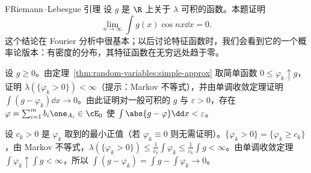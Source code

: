 \begin{probleme}{F}{Riemann--Lebesgue 引理}
设 $g$ 是 $\R$ 上关于 $\lambda$ 可积的函数。本题证明
\[
\lim_{n\to\infty}\int g(x)\cos nx\dd x=0 .
\]
这个结论在 Fourier 分析中很基本；以后讨论特征函数时，我们会看到它的一个概率论版本：有密度的分布，其特征函数在无穷远处趋于零。
\begin{questions}
\item 设 $g\geqslant0$。由定理~\ref{thm:random-variables:simple-approx} 取简单函数 $0\leqslant\varphi_k\uparrow g$，证明 $\lambda(\{\varphi_k>0\})<\infty$（提示：Markov 不等式），并由单调收敛定理证明 $\int(g-\varphi_k)\dd x\to0$。由此证明对一般可积的 $g$ 与 $\varepsilon>0$，存在 $\varphi=\sum_{i=1}^mb_i\one_{A_i}\in\cE_0$ 使 $\int\abs{g-\varphi}\dd x<\varepsilon$。
\begin{solution}
设 $c_k>0$ 是 $\varphi_k$ 取到的最小正值（若 $\varphi_k\equiv0$ 则无需证明）。$\{\varphi_k>0\}=\{\varphi_k\geqslant c_k\}$，由 Markov 不等式，$\lambda(\{\varphi_k>0\})\leqslant\frac1{c_k}\int\varphi_k\leqslant\frac1{c_k}\int g<\infty$。由单调收敛定理 $\int\varphi_k\uparrow\int g<\infty$，所以 $\int(g-\varphi_k)=\int g-\int\varphi_k\to0$。


\end{solution}
\end{questions}
\end{probleme}
